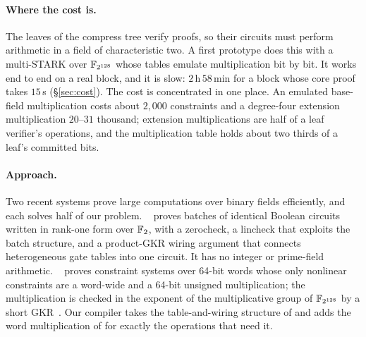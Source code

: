 \paragraph{Where the cost is.} The leaves of the compress tree verify \KB{} proofs, so their circuits must perform \KB{} arithmetic in a field of characteristic two. A first prototype does this with a multi-STARK over $\mathbb{F}_{2^{128}}$ whose tables emulate \KB{} multiplication bit by bit. It works end to end on a real block, and it is slow: $2$\,h\,$58$\,min for a block whose core proof takes $15$\,s (\S\ref{sec:cost}). The cost is concentrated in one place. An emulated \KB{} base-field multiplication costs about $2{,}000$ \AND{} constraints and a degree-four extension multiplication $20$--$31$ thousand; extension multiplications are half of a leaf verifier's operations, and the multiplication table holds about two thirds of a leaf's committed bits.

\paragraph{Approach.} Two recent systems prove large computations over binary fields efficiently, and each solves half of our problem.
\Flock{}~\citep{flock} proves batches of identical Boolean circuits written in rank-one form over $\mathbb{F}_{2}$, with a zerocheck, a lincheck that exploits the batch structure, and a product-GKR wiring argument that connects heterogeneous gate tables into one circuit. It has no integer or prime-field arithmetic.
\Binius{}~\citep{binius64} proves constraint systems over 64-bit words whose only nonlinear constraints are a word-wide \AND{} and a 64-bit unsigned multiplication; the multiplication is checked in the exponent of the multiplicative group of $\mathbb{F}_{2^{128}}$ by a short GKR~\citep{gkr-cmt}.
Our compiler takes the table-and-wiring structure of \Flock{} and adds the word multiplication of \Binius{} for exactly the operations that need it.

